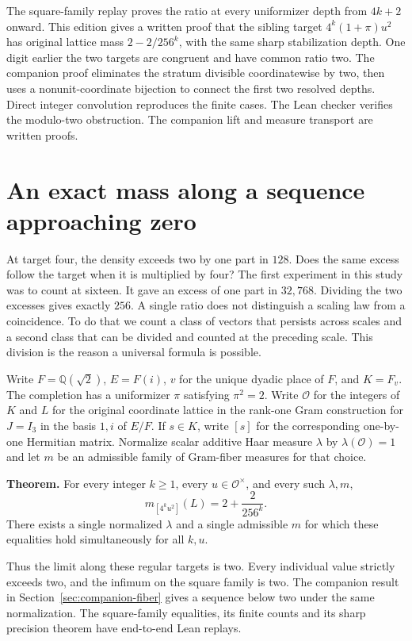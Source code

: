 \documentclass[12pt,letterpaper]{article}
\newcommand{\ruleline}{\par\vspace{1pt}{\color{accent}\rule{\linewidth}{.35pt}}\par}
\begin{document}
\par
The square-family replay proves the ratio at every uniformizer depth from $4k+2$ onward. This edition gives a written proof that the sibling target $4^k(1+\pi)u^2$ has original lattice mass $2-2/256^k$, with the same sharp stabilization depth. One digit earlier the two targets are congruent and have common ratio two. The companion proof eliminates the stratum divisible coordinatewise by two, then uses a nonunit-coordinate bijection to connect the first two resolved depths. Direct integer convolution reproduces the finite cases. The Lean checker verifies the modulo-two obstruction. The companion lift and measure transport are written proofs.
\clearpage
\makeatletter
\begingroup\small\setlength{\parskip}{0pt}
\renewcommand*{\l@section}[2]{\addvspace{3pt}\@dottedtocline{1}{0em}{1.9em}{#1}{#2}}
\tableofcontents\endgroup
\makeatother
\clearpage{}
\section{An exact mass along a sequence approaching zero}
At target four, the density exceeds two by one part in $128$. Does the same excess follow the target when it is multiplied by four? The first experiment in this study was to count at sixteen. It gave an excess of one part in $32{,}768$. Dividing the two excesses gives exactly $256$. A single ratio does not distinguish a scaling law from a coincidence. To do that we count a class of vectors that persists across scales and a second class that can be divided and counted at the preceding scale. This division is the reason a universal formula is possible.

Write $F=\mathbb Q(\sqrt2)$, $E=F(i)$, $v$ for the unique dyadic place of $F$, and $K=F_v$. The completion has a uniformizer $\pi$ satisfying $\pi^2=2$. Write $\mathcal O$ for the integers of $K$ and $L$ for the original coordinate lattice in the rank-one Gram construction for $J=I_3$ in the basis $1,i$ of $E/F$. If $s\in K$, write $[s]$ for the corresponding one-by-one Hermitian matrix. Normalize scalar additive Haar measure $\lambda$ by $\lambda(\mathcal O)=1$ and let $m$ be an admissible family of Gram-fiber measures for that choice.

\begin{center}\begin{minipage}{.93\linewidth}\ruleline
\textbf{Theorem.} For every integer $k\geq1$, every $u\in\mathcal O^\times$, and every such $\lambda,m$,
\[
       m_{[4^k u^2]}(L)=2+\frac{2}{256^k}.
\]
There exists a single normalized $\lambda$ and a single admissible $m$ for which these equalities hold simultaneously for all $k,u$.
\ruleline\end{minipage}\end{center}
Thus the limit along these regular targets is two. Every individual value strictly exceeds two, and the infimum on the square family is two. The companion result in Section~\ref{sec:companion-fiber} gives a sequence below two under the same normalization. The square-family equalities, its finite counts and its sharp precision theorem have end-to-end Lean replays.
\end{document}
